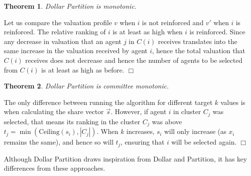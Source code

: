 \documentclass[letterpaper]{article}
\newtheorem{theorem}{Theorem}
\newtheorem{remark}{Remark}
\newcommand{\qed}{\unskip\hspace*{1em}\hspace{\fill}$\Box$}
\newenvironment{proof}[1][Proof]{\begin{trivlist}
 \item[\hskip \labelsep {\it #1:}]}{%
 \qed\end{trivlist}}
\newcommand{\nick}[1]{\textcolor{kentuckyblue}{\textbf{Nick Says: #1}}}
\begin{document}
		
		\begin{theorem}
			Dollar Partition is monotonic. 
			\end{theorem}
			\begin{proof}
	
	Let us compare the valuation profile $v$ when $i$ is not reinforced and $v'$ when $i$ is reinforced. 
The relative ranking of $i$ is at least as high when $i$ is reinforced. Since any decrease in valuation that an agent $j$ in $C(i)$ receives translates into the same increase in the valuation received by agent $i$, hence the total valuation that $C(i)$ receives does not decrease and hence the number of agents to be selected from $C(i)$ is at least as high as before. 
\end{proof}

	\begin{theorem}
		Dollar Partition is committee monotonic. 
		\end{theorem}
		\begin{proof}
The only difference between running the algorithm for different target $k$ values is when calculating the share vector $\vec{s}$. However, if agent $i$ in cluster $C_{j}$ was selected, that means its ranking in the cluster $C_{j}$ was above $t_{j}=\min(\text{Ceiling}(s_{i}),|C_{j}|)$. When $k$ increases, $s_{i}$ will only increase (as $x_{i}$ remains the same), and hence so will $t_{j}$, ensuring that $i$ will be selected again.%
			\end{proof}



Although Dollar Partition draws inspiration from Dollar and Partition, it has key differences from these approaches.
\end{document}
